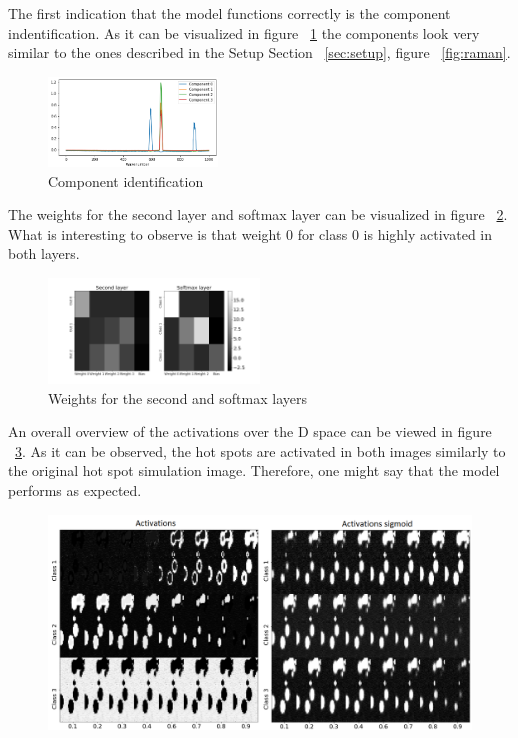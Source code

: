 \documentclass{article}
\begin{document}
The first indication that the model functions correctly is the component indentification. As it can be visualized in figure ~\ref{fig:components} the components look very similar to the ones described in the Setup Section ~\ref{sec:setup}, figure ~\ref{fig:raman}.\\
\begin{figure}[!h]
	\centering
	\includegraphics[width=0.4\textwidth]{figures_3/raman_sim_3_encode_layer_1_finetune_13.png}
	\caption{Component identification}
	\label{fig:components}
\end{figure}
The weights for the second layer and softmax layer can be visualized in figure ~\ref{fig:weights}. What is interesting to observe is that weight 0 for class 0 is highly activated in both layers.\\ 
\begin{figure}[!h]
  \includegraphics[width=0.5\textwidth]{figures_2/raman_sim_second_softmax_encode.png}
  \caption{Weights for the second and softmax layers}
  \label{fig:weights}
\end{figure}
An overall overview of the activations over the D space can be viewed in figure ~\ref{fig:activations}. As it can be observed, the hot spots are activated in both images similarly to the original hot spot simulation image. Therefore, one might say that the model performs as expected.
\begin{figure}[!h]
  \includegraphics[width=1\linewidth]{figures_3/DNN_prop_sigmoid_im.png}
    \label{fig:activations}
\end{figure}
\end{document}
